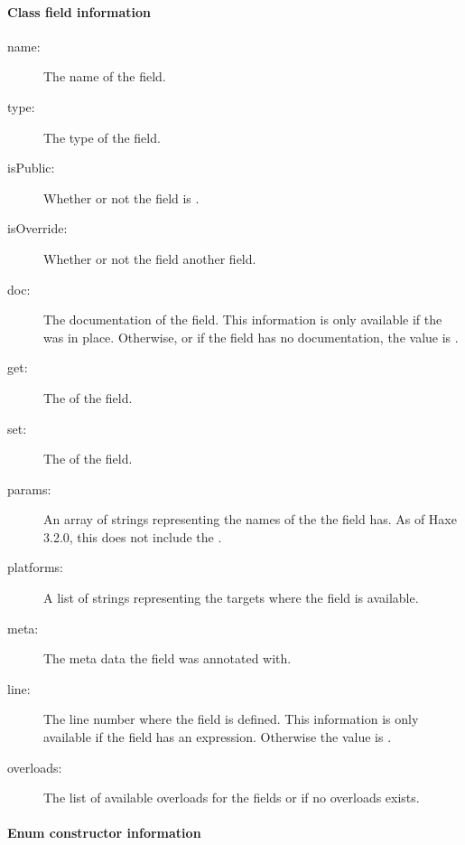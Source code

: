     
\paragraph{Class field information}
\label{cr-rtti-class-field-information}

\begin{description}
    \item[name:] The name of the field.
    \item[type:] The type of the field.
    \item[isPublic:] Whether or not the field is .
    \item[isOverride:] Whether or not the field  another field.
    \item[doc:] The documentation of the field. This information is only available if the   was in place. Otherwise, or if the field has no documentation, the value is .
    \item[get:] The  of the field.
    \item[set:] The  of the field.
    \item[params:] An array of strings representing the names of the  the field has. As of Haxe 3.2.0, this does not include the .
    \item[platforms:] A list of strings representing the targets where the field is available.
    \item[meta:] The meta data the field was annotated with.
    \item[line:] The line number where the field is defined. This information is only available if the field has an expression. Otherwise the value is .
    \item[overloads:] The list of available overloads for the fields or  if no overloads exists.
\end{description}

\paragraph{Enum constructor information}
\label{cr-rtti-enum-constructor-information}

